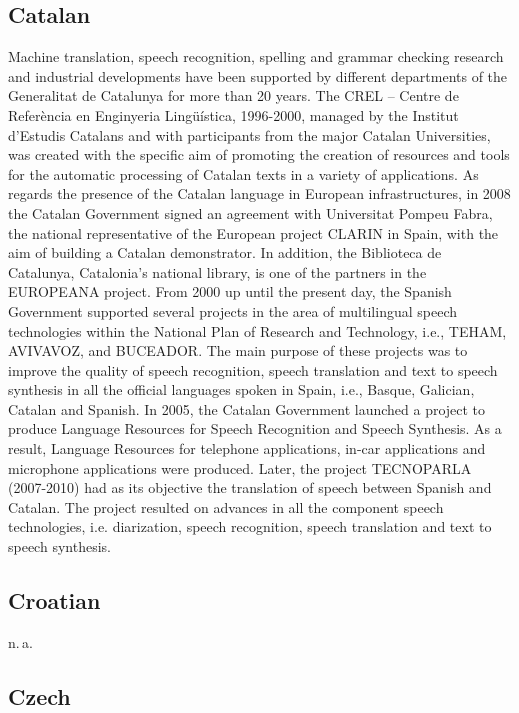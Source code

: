 \documentclass[10pt, plain]{../../metanetpaper}
\begin{document}
\begin{multicols}{2}
\subsection*{Catalan}
\label{sec:catalan}

Machine translation, speech recognition, spelling and grammar checking research and industrial developments have been supported by different departments of the Generalitat de Catalunya for more than 20 years. The CREL – Centre de Referència en Enginyeria Lingüística, 1996-2000, managed by the Institut d’Estudis Catalans and with participants from the major Catalan Universities, was created with the specific aim of promoting the creation of resources and tools for the automatic processing of Catalan texts in a variety of applications. As regards the presence of the Catalan language in European infrastructures, in 2008 the Catalan Government signed an agreement with Universitat Pompeu Fabra, the national representative of the European project CLARIN in Spain, with the aim of building a Catalan demonstrator. In addition, the Biblioteca de Catalunya, Catalonia’s national library, is one of the partners in the EUROPEANA project. From 2000 up until the present day, the Spanish Government supported several projects in the area of multilingual speech technologies within the National Plan of Research and Technology, i.e., TEHAM, AVIVAVOZ, and BUCEADOR. The main purpose of these projects was to improve the quality of speech recognition, speech translation and text to speech synthesis in all the official languages spoken in Spain, i.e., Basque, Galician, Catalan and Spanish. In 2005, the Catalan Government launched a project to produce Language Resources for Speech Recognition and Speech Synthesis. As a result, Language Resources for telephone applications, in-car applications and microphone applications were produced. Later, the project TECNOPARLA (2007-2010) had as its objective the translation of speech between Spanish and Catalan. The project resulted on advances in all the component speech technologies, i.e. diarization, speech recognition, speech translation and text to speech synthesis.

\subsection*{Croatian}
\label{sec:croatian}

n.\,a.

\subsection*{Czech}
\label{sec:czech}


\end{multicols}
\end{document}
